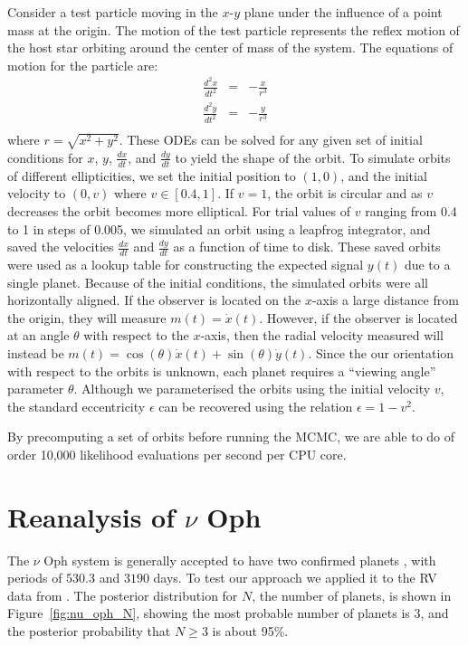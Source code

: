 \documentclass[useAMS,usenatbib]{mn2e}
\begin{document}
Consider a test particle moving in the $x$-$y$ plane under the influence of a
point mass at the origin. The motion of the test particle represents the
reflex motion of the host star orbiting around the center of mass of the
system. The equations of motion for the particle are:
\begin{eqnarray}
\frac{d^2x}{dt^2} &=& -\frac{x}{r^3} \\
\frac{d^2y}{dt^2} &=& -\frac{y}{r^3} \\
\end{eqnarray}
where $r = \sqrt{x^2 + y^2}$. These ODEs can be solved for any given set of
initial conditions for $x$, $y$, $\frac{dx}{dt}$, and $\frac{dy}{dt}$ to yield
the shape of the orbit. To simulate orbits
of different ellipticities, we set the initial position to $(1, 0)$, and
the initial velocity to $(0, v)$ where $v \in [0.4, 1]$.
If $v=1$, the orbit is circular and as $v$ decreases the orbit becomes more
elliptical. For trial values of $v$ ranging from 0.4 to 1 in steps of 0.005,
we simulated an orbit using a leapfrog integrator, and saved the
velocities $\frac{dx}{dt}$ and $\frac{dy}{dt}$ as a function of time to disk.
These saved orbits were used as a lookup table for constructing the expected
signal $y(t)$ due to a single planet.
Because of the initial conditions, the simulated orbits were all horizontally
aligned. If the observer is located on the $x$-axis a large distance
from the origin, they will measure $m(t) = \dot{x}(t)$. However, if the
observer is located at an angle $\theta$ with respect to the $x$-axis, then
the radial velocity measured will instead be
$m(t) = \cos(\theta)\dot{x}(t) + \sin(\theta)\dot{y}(t)$.
Since the our orientation with respect to the orbits is unknown, each planet
requires a ``viewing angle'' parameter $\theta$.
Although we parameterised the orbits using the initial velocity $v$,
the standard eccentricity $\epsilon$ can be recovered using the relation
$\epsilon = 1 - v^2$.

By precomputing a set of orbits before running the MCMC, we are able to
do of order 10,000 likelihood evaluations per second per CPU core.

\section{Reanalysis of $\nu$ Oph}
The $\nu$ Oph system is generally accepted to have two confirmed planets
\citep[e.g.][]{2011AIPC.1331..102Q, 2012PASJ...64..135S, fengji}, with periods
of $530.3$ and $3190$ days. To test our approach we applied it to the RV
data from \citep{2012PASJ...64..135S}.
The posterior distribution for $N$, the number of planets, is shown in
Figure~\ref{fig:nu_oph_N}, showing the most probable number of planets is 3,
and the posterior probability that $N \geq 3$ is about 95\%.
\end{document}
